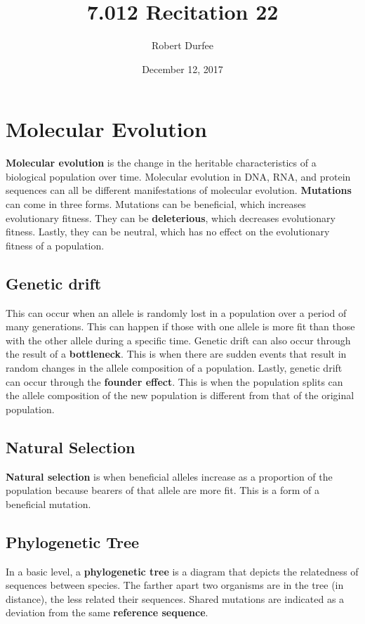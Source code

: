 \documentclass{article}
\title{ 7.012 Recitation 22 }
\author{ Robert Durfee }
\date{ December 12, 2017 }
\begin{document}
\maketitle

\section{ Molecular Evolution }

\textbf{Molecular evolution} is the change in the heritable characteristics of a
biological population over time. Molecular evolution in DNA, RNA, and protein
sequences can all be different manifestations of molecular evolution.
\textbf{Mutations} can come in three forms. Mutations can be beneficial, which
increases evolutionary fitness. They can be \textbf{deleterious}, which
decreases evolutionary fitness. Lastly, they can be neutral, which has no effect
on the evolutionary fitness of a population.

\subsection{Genetic drift}

This can occur when an allele is randomly lost in a population over a period of
many generations. This can happen if those with one allele is more fit than
those with the other allele during a specific time.  Genetic drift can also
occur through the result of a \textbf{bottleneck}. This is when there are sudden
events that result in random changes in the allele composition of a population.
Lastly, genetic drift can occur through the \textbf{founder effect}. This is
when the population splits can the allele composition of the new population is
different from that of the original population.

\subsection{Natural Selection}

\textbf{Natural selection} is when beneficial alleles increase as a proportion of
the population because bearers of that allele are more fit. This is a form of a
beneficial mutation.

\subsection{Phylogenetic Tree}

In a basic level, a \textbf{phylogenetic tree} is a diagram that depicts the
relatedness of sequences between species. The farther apart two organisms are in
the tree (in distance), the less related their sequences. Shared mutations
are indicated as a deviation from the same \textbf{reference sequence}.
\end{document}

